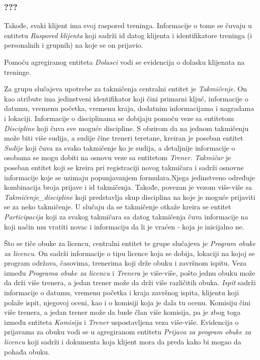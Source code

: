 \documentclass[../main.tex]{subfiles}
\begin{document}
\subsubsection{???}
Takođe, svaki klijent ima svoj raspored treninga. Informacije o tome se čuvaju u entitetu \textit{Raspored klijenta} koji sadrži id datog klijenta i identifikatore treninga (i personalnih i grupnih) na koje se on prijavio.

Pomoću agregiranog entiteta \textit{Dolasci} vodi se evidencija o dolasku klijenata na treninge.

Za grupu slučajeva upotrebe za takmičenja centralni entitet je \textit{Takmičenje}. On kao atribute ima jedinstveni identifikator koji čini primarni ključ, informacije o datumu, vremenu početka, vremenu kraja, dodatnim informacijama i nagradama i lokaciji. Informacije o disciplinama se dobijaju pomoću veze sa entitetom \textit{Discipline} koji čuva sve moguće discipline. S obzirom da na jednom takmičenju može biti više sudija, a sudije čine treneri teretane, kreiran je poseban entitet \textit{Sudije} koji čuva za svako takmičenje ko je sudija, a detaljnije informacije o osobama se mogu dobiti na osnovu veze sa entitetom \textit{Trener}. \textit{Takmičar} je poseban entitet koji se kreira pri registraciji novog takmičara i sadrži osnovne informacije koje se uzimaju popunjavanjem formulara.Njega jedinstveno određuje kombinacija broja prijave i id takmičenja. Takođe, povezan je vezom više-više sa \textit{Takmičenje\_discipline} koji predstavlja skup disciplina na koje je moguće prijaviti se za neko takmičenje. U slučaju da se takmičenje otkaže kreira se entitet \textit{Participacija} koji za svakog takmičara sa datog takmičenja čuva informacije na koji način mu vratiti novac i informaciju da li je vraćen - koja je inicijalno ne. 

Što se tiče obuke za licencu, centralni entitet te grupe slučajeva je \textit{Program obuke za licencu}. On sadrži informacije o tipu licence koja se dobija, lokaciji na kojoj se program održava, časovima, trenerima koji drže obuku i završnom ispitu. Veza između \textit{Programa obuke za licencu} i \textit{Trenera} je više-više, pošto jednu obuku može da drži više trenera, a jedan trener može da drži više različitih obuka. \textit{Ispit} sadrži informacije o datumu, vremenu početka i kraja završnog ispita, klijentu koji polaže ispit, njegovoj oceni, kao i o komisiji koja je dala tu ocenu. Komisiju čini više trenera, a jedan trener može da bude član više komisija, pa je zbog toga između entiteta \textit{Komisija} i \textit{Trener} uspostavljena veza više-više. Evidencija o prijavama za obuku vodi se u agregiranom entitetu \textit{Prijava za program obuke za licencu} koji sadrži i dokumenta koja klijent mora da preda kako bi mogao da pohađa obuku.
\end{document}
